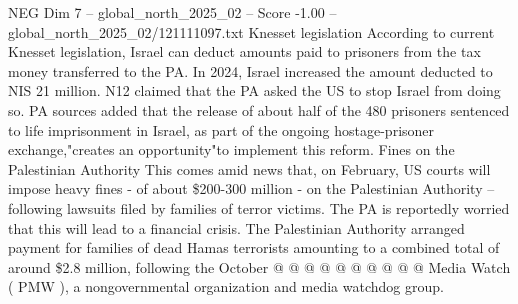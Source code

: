 \begin{textsample}{NEG Dim 7 – global\_north\_2025\_02 – Score -1.00 – global\_north\_2025\_02/121111097.txt}
Knesset legislation According to current Knesset legislation, Israel can deduct amounts paid to prisoners from the tax money transferred to the PA.
In 2024, Israel increased the amount deducted to NIS 21 million.
N12 claimed that the PA asked the US to stop Israel from doing so.
PA sources added that the release of about half of the 480 prisoners sentenced to life imprisonment in Israel, as part of the ongoing hostage-prisoner exchange,"creates an opportunity"to implement this reform.
Fines on the Palestinian Authority This comes amid news that, on February, US courts will impose heavy fines - of about \$200-300 million - on the Palestinian Authority -- following lawsuits filed by families of terror victims.
The PA is reportedly worried that this will lead to a financial crisis.
The Palestinian Authority arranged payment for families of dead Hamas terrorists amounting to a combined total of around \$2.8 million, following the October @ @ @ @ @ @ @ @ @ @ Media Watch ( PMW ), a nongovernmental organization and media watchdog group.

\end{textsample}
